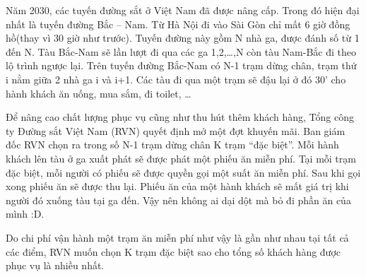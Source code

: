 Năm 2030, các tuyến đường sắt ở Việt Nam đã được nâng cấp. Trong đó hiện đại nhất là tuyến đường Bắc – Nam. Từ Hà Nội đi vào Sài Gòn chỉ mất 6 giờ đồng hồ(thay vì 30 giờ như trước). Tuyến đường này gồm N nhà ga, được đánh số từ 1 đến N. Tàu Bắc-Nam sẽ lần lượt đi qua các ga 1,2,…,N còn tàu Nam-Bắc đi theo lộ trình ngược lại. Trên tuyến đường Bắc-Nam có N-1 trạm dừng chân, trạm thứ i nằm giữa 2 nhà ga i và i+1. Các tàu đi qua một trạm sẽ đậu lại ở đó 30’ cho hành khách ăn uống, mua sắm, đi toilet, …  

   Để nâng cao chất lượng phục vụ cũng như thu hút thêm khách hàng, Tổng công ty Đường sắt Việt Nam (RVN) quyết định mở một đợt khuyến mãi. Ban giám đốc RVN chọn ra trong số N-1 trạm dừng chân K trạm “đặc biệt”. Mỗi hành khách lên tàu ở ga xuất phát sẽ được phát một phiếu ăn miễn phí. Tại mỗi trạm đặc biệt, mỗi người có phiếu sẽ được quyền gọi một suất ăn miễn phí. Sau khi gọi xong phiếu ăn sẽ được thu lại. Phiếu ăn của một hành khách sẽ mất giá trị khi người đó xuống tàu tại ga đến. Vậy nên không ai dại dột mà bỏ đi phần ăn của mình :D.  

   Do chi phí vận hành một trạm ăn miễn phí như vậy là gần như nhau tại tất cả các điểm, RVN muốn chọn K trạm đặc biệt sao cho tổng số khách hàng được phục vụ là nhiều nhất.  

\